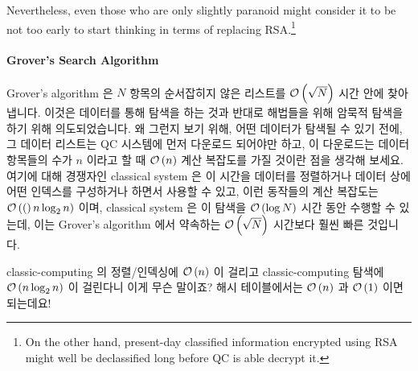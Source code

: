 Nevertheless, even those who are only slightly paranoid might consider
it to be not too early to start thinking in terms of replacing RSA.\footnote{
	On the other hand, present-day classified information encrypted
	using RSA might well be declassified long before QC is able
	decrypt it.}
\fi

\paragraph{Grover's Search Algorithm}
\label{sec:future:Grover's Search Algorithm}

Grover's algorithm 은 $N$ 항목의 순서잡히지 않은 리스트를 $\mathcal{O}\left(\sqrt N\right)$ 시간
안에 찾아냅니다.
이것은 데이터를 통해 탐색을 하는 것과 반대로 해법들을 위해 암묵적 탐색을 하기
위해 의도되었습니다.
왜 그런지 보기 위해, 어떤 데이터가 탐색될 수 있기 전에, 그 데이터 리스트는 QC
시스템에 먼저 다운로드 되어야만 하고, 이 다운로드는 데이터 항목들의 수가 $n$
이라고 할 때 $\mathcal{O}\left(n\right)$ 계산 복잡도를 가질 것이란 점을 생각해 보세요.
여기에 대해 경쟁자인 classical system 은 이 시간을 데이터를 정렬하거나 데이터
상에 어떤 인덱스를 구성하거나 하면서 사용할 수 있고, 이런 동작들의 계산
복잡도는 $\mathcal{O}\left((\right)n \log_2 n)$ 이며, classical system 은 이 탐색을 $\mathcal{O}\left(\log N\right)$ 시간
동안 수행할 수 있는데, 이는 Grover's algorithm 에서 약속하는 $\mathcal{O}\left(\sqrt N\right)$
시간보다 훨씬 빠른 것입니다.

\QuickQuiz{}
	classic-computing 의 정렬/인덱싱에 $\mathcal{O}\left(n\right)$ 이 걸리고 classic-computing
	탐색에 $\mathcal{O}\left(n \log_2 n\right)$ 이 걸린다니 이게 무슨 말이죠?
	해시 테이블에서는 $\mathcal{O}\left(n\right)$ 과 $\mathcal{O}\left(1\right)$ 이면 되는데요!
	\iffalse

